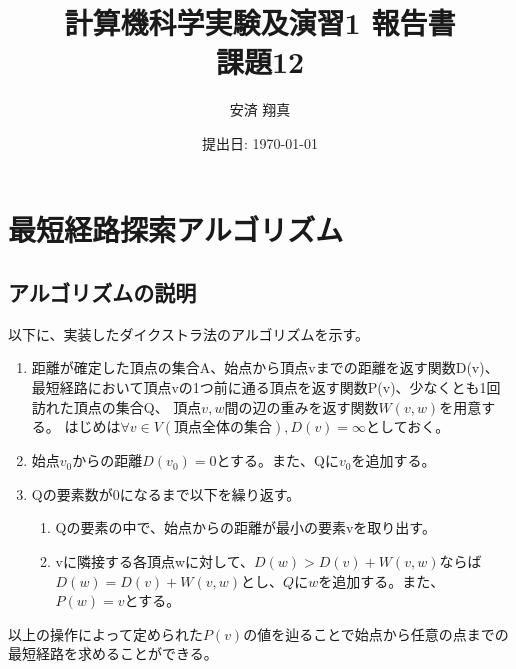\documentclass[a4j]{jarticle}
\begin{document}
\title{計算機科学実験及演習1 報告書 \\ \bf 課題12}
\author{安済 翔真}
\date{提出日: \today} %
\maketitle

\section{最短経路探索アルゴリズム}
\subsection{アルゴリズムの説明}
以下に、実装したダイクストラ法のアルゴリズムを示す。
\begin{enumerate}
  \item 距離が確定した頂点の集合A、始点から頂点vまでの距離を返す関数D(v)、
  最短経路において頂点vの1つ前に通る頂点を返す関数P(v)、少なくとも1回訪れた頂点の集合Q、
  頂点\(v, w\)間の辺の重みを返す関数\(W(v, w)\)を用意する。
  はじめは\(\forall v \in V(頂点全体の集合), D(v) = \infty \)としておく。
  \item 始点\(v_0\)からの距離\(D(v_0) = 0\)とする。また、Qに\(v_0\)を追加する。
  \item Qの要素数が0になるまで以下を繰り返す。
    \begin{enumerate}
      \item Qの要素の中で、始点からの距離が最小の要素vを取り出す。
      \item vに隣接する各頂点wに対して、\(D(w) > D(v) + W(v, w)\)ならば
      \(D(w) = D(v) + W(v, w)\)とし、\(Qにw\)を追加する。また、\(P(w) = v\)とする。
    \end{enumerate}
\end{enumerate}
以上の操作によって定められた\(P(v)\)の値を辿ることで始点から任意の点までの最短経路を求めることができる。

\newpage
\end{document}
